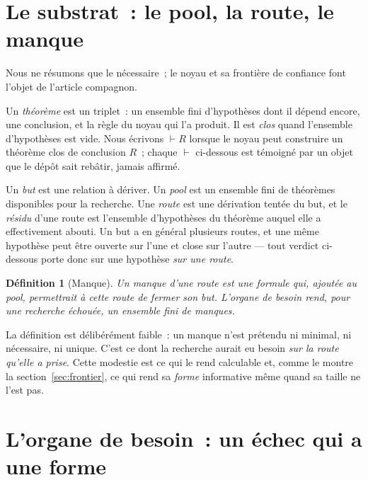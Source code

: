\documentclass[11pt]{article}
\newtheorem{definition}{Définition}
\theoremstyle{remark}\newtheorem{remarque}{Remarque}
\begin{document}
\section{Le substrat~: le pool, la route, le manque}
\label{sec:background}

Nous ne résumons que le nécessaire~; le noyau et sa frontière de confiance font l'objet
de l'article compagnon.

Un \emph{théorème} est un triplet~: un ensemble fini d'hypothèses dont il dépend encore,
une conclusion, et la règle du noyau qui l'a produit. Il est \emph{clos} quand
l'ensemble d'hypothèses est vide. Nous écrivons $\vdash R$ lorsque le noyau peut
construire un théorème clos de conclusion $R$~; chaque $\vdash$ ci-dessous est témoigné
par un objet que le dépôt sait rebâtir, jamais affirmé.

Un \emph{but} est une relation à dériver. Un \emph{pool} est un ensemble fini de
théorèmes disponibles pour la recherche. Une \emph{route} est une dérivation tentée du
but, et le \emph{résidu} d'une route est l'ensemble d'hypothèses du théorème auquel elle
a effectivement abouti. Un but a en général plusieurs routes, et une même hypothèse peut
être ouverte sur l'une et close sur l'autre --- tout verdict ci-dessous porte donc sur
une hypothèse \emph{sur une route}.

\begin{definition}[Manque]\label{def:gap}
Un \emph{manque} d'une route est une formule qui, ajoutée au pool, permettrait à cette
route de fermer son but. L'organe de besoin rend, pour une recherche échouée, un
ensemble fini de manques.
\end{definition}

La définition est délibérément faible~: un manque n'est prétendu ni minimal, ni
nécessaire, ni unique. C'est ce dont la recherche aurait eu besoin \emph{sur la route
qu'elle a prise}. Cette modestie est ce qui le rend calculable et, comme le montre la
section~\ref{sec:frontier}, ce qui rend sa \emph{forme} informative même quand sa taille
ne l'est pas.

\section{L'organe de besoin~: un échec qui a une forme}
\label{sec:organ}
\end{document}
